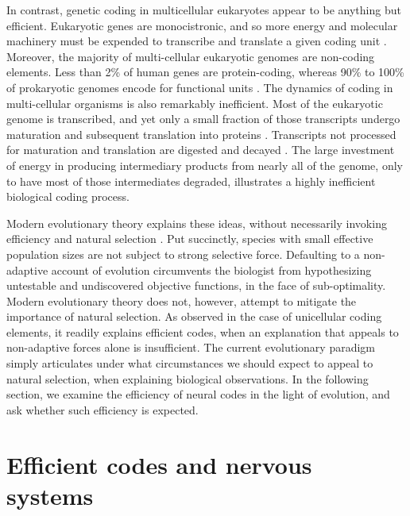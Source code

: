 \documentclass{article}
\begin{document}
In contrast, genetic coding in multicellular eukaryotes appear to be anything but efficient. Eukaryotic genes are monocistronic, and so more energy and molecular machinery must be expended to transcribe and translate a given coding unit \cite{kozak_1999}. Moreover, the majority of multi-cellular eukaryotic genomes are non-coding elements. Less than 2\% of human genes are protein-coding, whereas  90\% to 100\% of prokaryotic genomes encode for functional units \cite{milo2016cell}. The dynamics of coding in multi-cellular organisms is also remarkably inefficient. Most of the eukaryotic genome is transcribed, and yet only a small fraction of those transcripts undergo maturation and subsequent translation into proteins \cite{menet_rosbash_2012}. Transcripts not processed for maturation and translation are digested and decayed \cite{mcnicoll_neugebauer_2014}. The large investment of energy in producing intermediary products from nearly all of the genome, only to have most of those intermediates degraded, illustrates a highly inefficient biological coding process. 

Modern evolutionary theory explains these ideas, without necessarily invoking efficiency and natural selection \cite{lynch2007origins}. Put succinctly, species with small effective population sizes are not subject to strong selective force. Defaulting to a non-adaptive account of evolution circumvents the biologist from hypothesizing untestable and undiscovered objective functions, in the face of sub-optimality. Modern evolutionary theory does not, however, attempt to mitigate the importance of natural selection. As observed in the case of unicellular coding elements, it readily explains efficient codes, when an explanation that appeals to non-adaptive forces alone is insufficient. The current evolutionary paradigm simply articulates under what circumstances we should expect to appeal to natural selection, when explaining biological observations. In the following section, we examine the efficiency of neural codes in the light of evolution, and ask whether such efficiency is expected. 

\section{Efficient codes and nervous systems}
\end{document}
